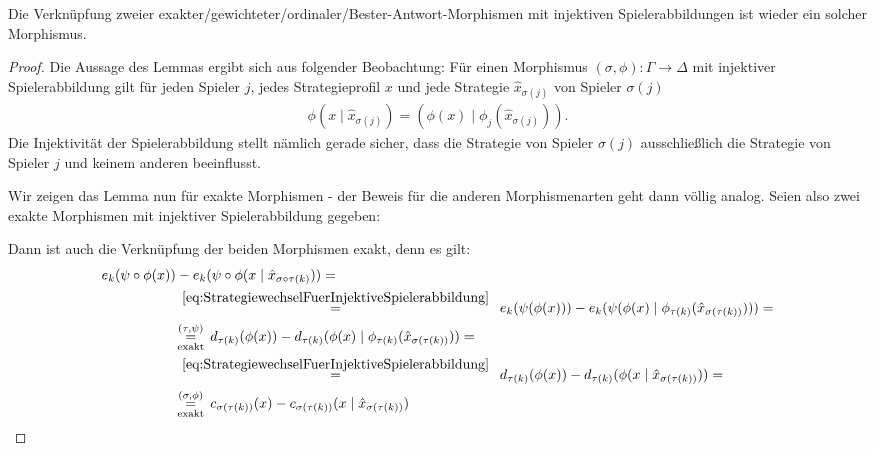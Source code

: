 \begin{lemma}\label{lemma:KompositionVonMorphismen}
	Die Verknüpfung zweier exakter/gewichteter/ordinaler/Bester-Antwort-Morphismen mit injektiven Spielerabbildungen ist wieder ein solcher Morphismus.
\end{lemma}

\begin{proof}
	Die Aussage des Lemmas ergibt sich aus folgender Beobachtung: Für einen Morphismus $(\sigma, \phi): \Gamma \to \Delta$ mit injektiver Spielerabbildung gilt für jeden Spieler $j$, jedes Strategieprofil $x$ und jede Strategie $\hat{x}_{\sigma(j)}$ von Spieler $\sigma(j)$
		\begin{align}\label{eq:StrategiewechselFuerInjektiveSpielerabbildung}
			\phi(x \mid \hat{x}_{\sigma(j)}) = (\phi(x) \mid \phi_{j}(\hat{x}_{\sigma(j)})).
		\end{align}
	Die Injektivität der Spielerabbildung stellt nämlich gerade sicher, dass die Strategie von Spieler $\sigma(j)$ ausschließlich die Strategie von Spieler $j$ und keinem anderen beeinflusst.
	
	Wir zeigen das Lemma nun für exakte Morphismen - der Beweis für die anderen Morphismenarten geht dann völlig analog. Seien also zwei exakte Morphismen mit injektiver Spielerabbildung gegeben:
		\begin{center}\end{center}
	Dann ist auch die Verknüpfung der beiden Morphismen exakt, denn es gilt:
		\begin{align*}
			e_k(\psi\circ\phi(x)) &- e_k(\psi\circ\phi(x \mid \hat{x}_{\sigma\circ\tau(k)})) = \\
				&\,\overset{\eqref{eq:StrategiewechselFuerInjektiveSpielerabbildung}}{=}\,\,\,
					e_k(\psi(\phi(x))) - e_k(\psi(\phi(x) \mid \phi_{\tau(k)}(\hat{x}_{\sigma(\tau(k))}))) = \\
				&\!\underset{\text{exakt}}{\overset{(\tau, \psi)}{=}}\,
					d_{\tau(k)}(\phi(x)) - d_{\tau(k)}(\phi(x) \mid \phi_{\tau(k)}(\hat{x}_{\sigma(\tau(k))})) = \\
				&\,\overset{\eqref{eq:StrategiewechselFuerInjektiveSpielerabbildung}}{=}\,\,\, 
					d_{\tau(k)}(\phi(x)) - d_{\tau(k)}(\phi(x \mid \hat{x}_{\sigma(\tau(k))})) = \\
				&\!\underset{\text{exakt}}{\overset{(\sigma, \phi)}{=}}\, 
					c_{\sigma(\tau(k))}(x) - c_{\sigma(\tau(k))}(x \mid \hat{x}_{\sigma(\tau(k))})
				\qedhere
		\end{align*}
\end{proof}

